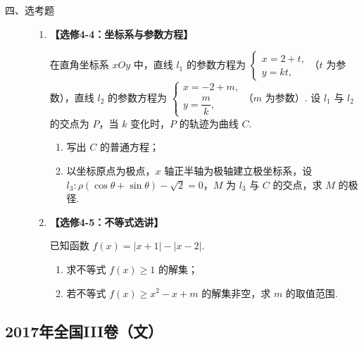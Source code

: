 \begin{description}

    \item[四、选考题]

    \begin{enumerate}[leftmargin=5pt]

      \addtocounter{enumi}{+21}

        \item \textbf{【选修4-4：坐标系与参数方程】}

在直角坐标系 \(xOy\) 中，直线 \(l_1\) 的参数方程为
\(\begin{cases}
x=2+t,\\
y=kt,
\end{cases}\)（\(t\) 为参数），直线 \(l_2\) 的参数方程为
\(\begin{cases}
x=-2+m,\\
y=\dfrac{m}{k},
\end{cases}\)（\(m\) 为参数）. 设 \(l_1\) 与 \(l_2\) 的交点为 \(P\)，当 \(k\) 变化时，\(P\) 的轨迹为曲线 \(C\).

\begin{enumerate}
\item 写出 \(C\) 的普通方程；
\item 以坐标原点为极点，\(x\) 轴正半轴为极轴建立极坐标系，设 \(l_3:\rho(\cos\theta+\sin\theta)-\sqrt2=0\)，\(M\) 为 \(l_3\) 与 \(C\) 的交点，求 \(M\) 的极径.
\end{enumerate}

        \item \textbf{【选修4-5：不等式选讲】}

已知函数 \(f(x)=\lvert x+1\rvert-\lvert x-2\rvert\).

\begin{enumerate}
\item 求不等式 \(f(x)\ge 1\) 的解集；
\item 若不等式 \(f(x)\ge x^2-x+m\) 的解集非空，求 \(m\) 的取值范围.
\end{enumerate}

    \end{enumerate}

\end{description}


\subsection{2017年全国III卷（文）}\label{gk:2017年全国III卷（文）}

